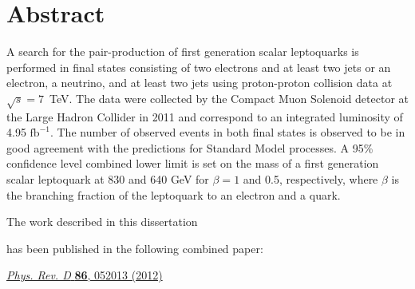 \chapter*{Abstract}


A search for the pair-production of first generation scalar leptoquarks
is performed in final states consisting of two electrons and at least
two jets or an electron, a neutrino, and at least two jets using 
proton-proton collision data at $\sqrt{s} = 7$~TeV.  The data were collected
by the Compact Muon Solenoid detector at the Large Hadron Collider in 2011 
and correspond to an integrated luminosity of 4.95 $\text{fb}^{-1}$.  
The number of observed events in both final states is observed to be in good agreement with 
the predictions for Standard Model processes.  A 95\% confidence level combined lower limit is set on the mass of a
first generation scalar leptoquark at 830 and 640 GeV for $\beta = 1$ and 0.5, respectively,
where $\beta$ is the branching fraction of the leptoquark to an electron and a quark.

\newpage

\thispagestyle{empty}
\vspace*{150pt}
\bigskip{}

\centerline{\large The work described in this dissertation}
\centerline{\large has been published in the following combined paper:}
\medskip{}
\medskip{}
\centerline{\large \href{http://dx.doi.org/10.1103/PhysRevD.86.052013}{{\em Phys. Rev. D} {\textbf{86}, 052013 (2012)}}}
\vfill

\newpage

